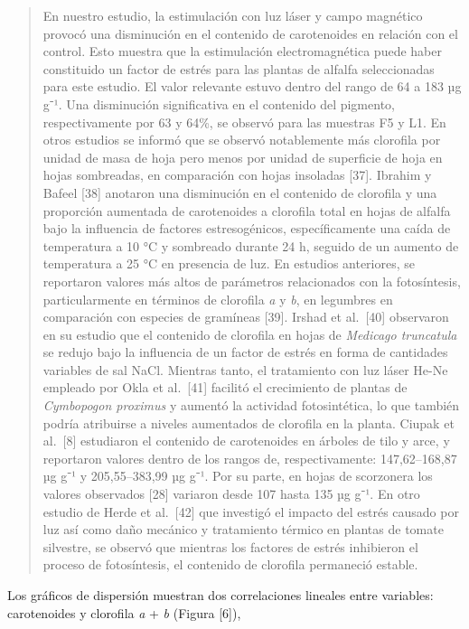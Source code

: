 \documentclass[
]{article}
\begin{document}
\begin{quote}
En nuestro estudio, la estimulación con luz láser y campo magnético
provocó una disminución en el contenido de carotenoides en relación con
el control. Esto muestra que la estimulación electromagnética puede
haber constituido un factor de estrés para las plantas de alfalfa
seleccionadas para este estudio. El valor relevante estuvo dentro del
rango de 64 a 183 µg g⁻¹. Una disminución significativa en el contenido
del pigmento, respectivamente por 63 y 64\%, se observó para las
muestras F5 y L1. En otros estudios se informó que se observó
notablemente más clorofila por unidad de masa de hoja pero menos por
unidad de superficie de hoja en hojas sombreadas, en comparación con
hojas insoladas {[}37{]}. Ibrahim y Bafeel {[}38{]} anotaron una
disminución en el contenido de clorofila y una proporción aumentada de
carotenoides a clorofila total en hojas de alfalfa bajo la influencia de
factores estresogénicos, específicamente una caída de temperatura a 10
°C y sombreado durante 24 h, seguido de un aumento de temperatura a 25
°C en presencia de luz. En estudios anteriores, se reportaron valores
más altos de parámetros relacionados con la fotosíntesis,
particularmente en términos de clorofila \emph{a} y \emph{b}, en
legumbres en comparación con especies de gramíneas {[}39{]}. Irshad et
al.~{[}40{]} observaron en su estudio que el contenido de clorofila en
hojas de \emph{Medicago truncatula} se redujo bajo la influencia de un
factor de estrés en forma de cantidades variables de sal NaCl. Mientras
tanto, el tratamiento con luz láser He-Ne empleado por Okla et
al.~{[}41{]} facilitó el crecimiento de plantas de \emph{Cymbopogon
proximus} y aumentó la actividad fotosintética, lo que también podría
atribuirse a niveles aumentados de clorofila en la planta. Ciupak et
al.~{[}8{]} estudiaron el contenido de carotenoides en árboles de tilo y
arce, y reportaron valores dentro de los rangos de, respectivamente:
147,62--168,87 µg g⁻¹ y 205,55--383,99 µg g⁻¹. Por su parte, en hojas de
scorzonera los valores observados {[}28{]} variaron desde 107 hasta 135
µg g⁻¹. En otro estudio de Herde et al.~{[}42{]} que investigó el
impacto del estrés causado por luz así como daño mecánico y tratamiento
térmico en plantas de tomate silvestre, se observó que mientras los
factores de estrés inhibieron el proceso de fotosíntesis, el contenido
de clorofila permaneció estable.
\end{quote}

Los gráficos de dispersión muestran dos correlaciones lineales entre
variables: carotenoides y clorofila \emph{a} + \emph{b} (Figura
{[}6{]}),
\end{document}
